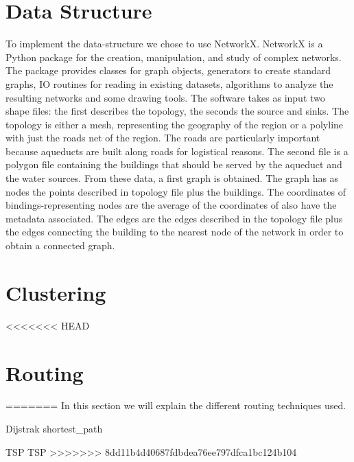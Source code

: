 \section{Data Structure}
\label{data_structure_technical}
To implement the data-structure we chose to use NetworkX. NetworkX is a Python package
for the creation, manipulation, and study of complex networks. The package provides
classes for graph objects, generators to create standard graphs, IO routines for reading in
existing datasets, algorithms to analyze the resulting networks and some drawing tools.
The software takes as input two shape files: the first describes the topology, the seconds
the source and sinks. The topology is either a mesh, representing the geography of the
region or a polyline with just the roads net of the region. The roads are particularly
important because aqueducts are built along roads for logistical reasons. The second file
is a polygon file containing the buildings that should be served by the aqueduct and the
water sources.
From these data, a first graph is obtained. The graph has as nodes the points described
in topology file plus the buildings. The coordinates of bindings-representing nodes are the
average of the coordinates of also have the metadata associated. The edges are the edges
described in the topology file plus the edges connecting the building to the nearest node
of the network in order to obtain a connected graph.

\section{Clustering} 
\label{Clustering_thecnical}

<<<<<<< HEAD
\section{Routing}
\label{Routing_thecnical}
=======
\label{Routing_thecnical}
In this section we will explain the different routing techniques used.

Dijstrak
 {shortest_path}

TSP
 {TSP}
>>>>>>> 8dd11b4d40687fdbdea76ee797dfca1bc124b104
